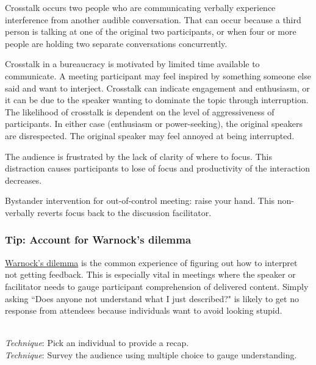 Crosstalk occurs two people who are communicating verbally experience interference from another audible conversation. That can occur because a third person is talking at one of the original two participants, or when four or more people are holding two separate conversations concurrently. 

Crosstalk in a bureaucracy is motivated by
limited time available to communicate. A meeting participant may feel inspired by something someone else said and want to interject. 
Crosstalk can indicate engagement and enthusiasm, or it can be due to the speaker wanting to dominate the topic through interruption. The likelihood of crosstalk is dependent on the level of aggressiveness of participants.
In either case (enthusiasm or power-seeking), the original speakers are disrespected. The original speaker may feel annoyed at being interrupted.



The audience is frustrated by the lack of clarity of where to focus. This distraction causes participants to lose of focus and productivity of the interaction decreases.

Bystander intervention for out-of-control meeting: raise your hand.  This non-verbally reverts focus back to the discussion facilitator. 

\subsubsection{Tip: Account for Warnock's dilemma}
\href{https://en.wikipedia.org/wiki/Warnock\%27s_dilemma}{Warnock's dilemma}
is the common experience of figuring out how to interpret not getting feedback. This is especially vital in meetings where the speaker or facilitator needs to gauge participant comprehension of delivered content. Simply asking ``Does anyone not understand what I just described?" is likely to get no response from attendees because individuals want to avoid looking stupid.

\ \\
\textit{Technique}: Pick an individual to provide a recap.\\
\textit{Technique}: Survey the audience using multiple choice to gauge understanding.

